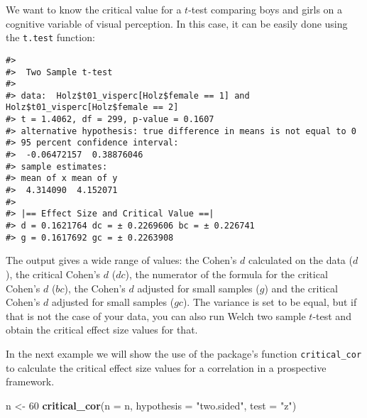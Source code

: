 \documentclass[
  man,floatsintext]{apa7}
\newenvironment{Shaded}{\begin{snugshade}}{\end{snugshade}}
\newcommand{\AttributeTok}[1]{\textcolor[rgb]{0.13,0.29,0.53}{#1}}
\newcommand{\DecValTok}[1]{\textcolor[rgb]{0.00,0.00,0.81}{#1}}
\newcommand{\FunctionTok}[1]{\textcolor[rgb]{0.13,0.29,0.53}{\textbf{#1}}}
\newcommand{\NormalTok}[1]{#1}
\newcommand{\OtherTok}[1]{\textcolor[rgb]{0.56,0.35,0.01}{#1}}
\newcommand{\SpecialCharTok}[1]{\textcolor[rgb]{0.81,0.36,0.00}{\textbf{#1}}}
\newcommand{\StringTok}[1]{\textcolor[rgb]{0.31,0.60,0.02}{#1}}
\begin{document}
\normalsize

We want to know the critical value for a \(t\)-test comparing boys and girls on a cognitive variable of visual perception. In this case, it can be easily done using the \texttt{t.test} function:

\footnotesize

\begin{Shaded}
\end{Shaded}

\begin{verbatim}
#> 
#>  Two Sample t-test
#> 
#> data:  Holz$t01_visperc[Holz$female == 1] and Holz$t01_visperc[Holz$female == 2]
#> t = 1.4062, df = 299, p-value = 0.1607
#> alternative hypothesis: true difference in means is not equal to 0
#> 95 percent confidence interval:
#>  -0.06472157  0.38876046
#> sample estimates:
#> mean of x mean of y 
#>  4.314090  4.152071 
#> 
#> |== Effect Size and Critical Value ==| 
#> d = 0.1621764 dc = ± 0.2269606 bc = ± 0.226741 
#> g = 0.1617692 gc = ± 0.2263908
\end{verbatim}

\normalsize

The output gives a wide range of values: the Cohen's \(d\) calculated on the data (\(d\)), the critical Cohen's \(d\) (\(dc\)), the numerator of the formula for the critical Cohen's \(d\) (\(bc\)), the Cohen's \(d\) adjusted for small samples (\(g\)) and the critical Cohen's \(d\) adjusted for small samples (\(gc\)). The variance is set to be equal, but if that is not the case of your data, you can also run Welch two sample \(t\)-test and obtain the critical effect size values for that.

In the next example we will show the use of the package's function \texttt{critical\_cor} to calculate the critical effect size values for a correlation in a prospective framework.

\footnotesize

\begin{Shaded}
\begin{Highlighting}[]
\NormalTok{n }\OtherTok{\textless{}{-}} \DecValTok{60}
\FunctionTok{critical\_cor}\NormalTok{(}\AttributeTok{n =}\NormalTok{ n, }\AttributeTok{hypothesis =} \StringTok{"two.sided"}\NormalTok{, }\AttributeTok{test =} \StringTok{"z"}\NormalTok{)}
\end{Highlighting}
\end{Shaded}
\end{document}
